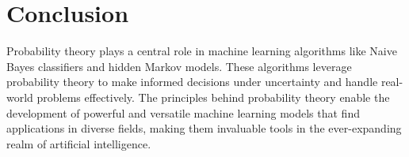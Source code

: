 \documentclass{article}
\begin{document}
\section{Conclusion}
Probability theory plays a central role in machine learning algorithms like Naive Bayes classifiers and hidden Markov models. These algorithms leverage probability theory to make informed decisions under uncertainty and handle real-world problems effectively. The principles behind probability theory enable the development of powerful and versatile machine learning models that find applications in diverse fields, making them invaluable tools in the ever-expanding realm of artificial intelligence.
\end{document}
